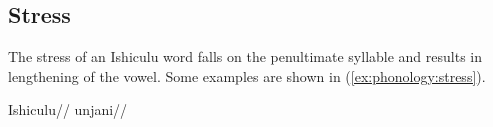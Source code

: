 \subsection{Stress}
The stress of an Ishiculu word falls on the penultimate syllable and results in lengthening of the vowel. Some examples are shown in (\ref{ex:phonology:stress}).
\begin{exe}
\ex
\begin{xlist}
\ex \textlangle Ishiculu\textrangle \quad // 
\ex \textlangle unjani\textrangle \quad // 
\end{xlist}
\label{ex:phonology:stress}
\end{exe}
